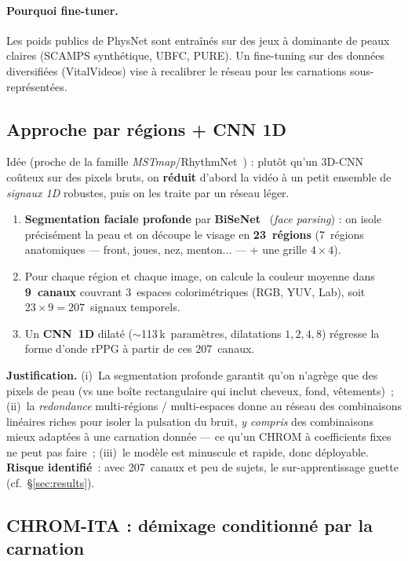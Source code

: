 \documentclass[11pt,a4paper]{article}
\begin{document}
\paragraph{Pourquoi fine-tuner.} Les poids publics de PhysNet sont entraînés sur
des jeux à dominante de peaux claires (SCAMPS synthétique, UBFC, PURE). Un
fine-tuning sur des données diversifiées (VitalVideos) vise à recalibrer le réseau
pour les carnations sous-représentées.

\subsection{Approche par régions + CNN 1D}
\label{sec:cnn1d}

Idée (proche de la famille \emph{MSTmap}/RhythmNet~\cite{niu2019,niu2020}) :
plutôt qu'un 3D-CNN coûteux sur des pixels bruts, on \textbf{réduit} d'abord la
vidéo à un petit ensemble de \emph{signaux 1D} robustes, puis on les traite par un
réseau léger.

\begin{enumerate}[leftmargin=1.4em]
\item \textbf{Segmentation faciale profonde} par \textbf{BiSeNet}~\cite{yu2018}
(\emph{face parsing}) : on isole précisément la peau et on découpe le visage en
\textbf{23~régions} (7~régions anatomiques --- front, joues, nez, menton... ---
+ une grille $4\times4$).
\item Pour chaque région et chaque image, on calcule la couleur moyenne dans
\textbf{9~canaux} couvrant 3~espaces colorimétriques (RGB, YUV, Lab), soit
$23\times9 = 207$~signaux temporels.
\item Un \textbf{CNN~1D} dilaté ($\sim$113\,k~paramètres, dilatations $1,2,4,8$)
régresse la forme d'onde rPPG à partir de ces 207~canaux.
\end{enumerate}

\noindent\textbf{Justification.} (i)~La segmentation profonde garantit qu'on
n'agrège que des pixels de peau (vs une boîte rectangulaire qui inclut cheveux,
fond, vêtements)~; (ii)~la \emph{redondance} multi-régions / multi-espaces donne
au réseau des combinaisons linéaires riches pour isoler la pulsation du bruit,
\emph{y compris} des combinaisons mieux adaptées à une carnation donnée
--- ce qu'un CHROM à coefficients fixes ne peut pas faire~; (iii)~le modèle est
minuscule et rapide, donc déployable. \textbf{Risque identifié}~: avec 207~canaux
et peu de sujets, le sur-apprentissage guette (cf.~§\ref{sec:results}).

\subsection{CHROM-ITA : démixage conditionné par la carnation}
\label{sec:chromita}
\end{document}
